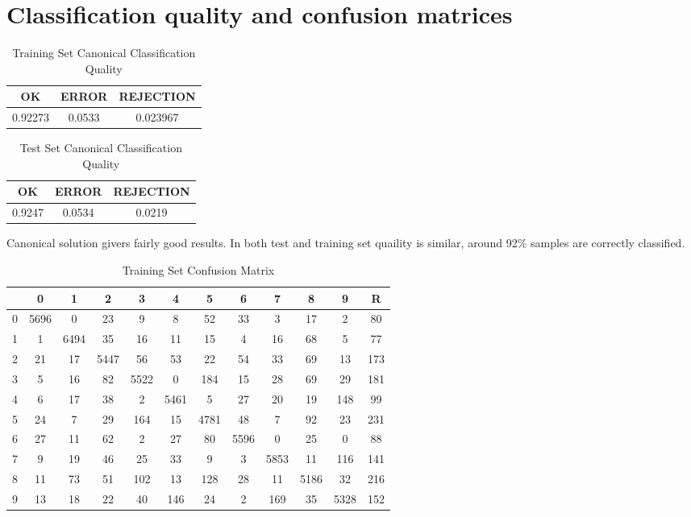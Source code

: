 \documentclass[a4paper, 11pt, wide]{article}
\begin{document}
  \section{Classification quality and confusion matrices}
  \begin{table}[H]
  \begin{center}
  \begin{tabular}{ |c|c|c| } 
  \hline
  OK & ERROR & REJECTION \\ 
  \hline
   0.92273 & 0.0533 & 0.023967 \\
  \hline
  \end{tabular}
  \end{center}
  \caption{Training Set Canonical Classification Quality}
  \end{table}
  \begin{table}[H]
  \begin{center}
  \begin{tabular}{ |c|c|c| } 
  \hline
  OK & ERROR & REJECTION \\ 
  \hline
  0.9247 & 0.0534 & 0.0219 \\
  \hline
  \end{tabular}
  \caption{Test Set Canonical Classification Quality }
  \end{center}
  \end{table}
  Canonical solution givers fairly good results.
  In both test and training set quaility is similar, around 92\% samples are correctly
  classified. \\
  \begin{table}[H]
  \begin{center}
  \begin{tabular}{ |c|c c c c c c c c c c|c| } 
  \hline
   & 0 & 1 & 2 & 3 & 4 & 5 & 6 & 7 & 8 & 9 & R\\ 
  \hline
	 0 & 5696 & 0 & 23 & 9 & 8 & 52 & 33 & 3 & 17 & 2 & 80 \\
	 1 & 1 & 6494 & 35 & 16 & 11 & 15 & 4 & 16 & 68 & 5 & 77 \\
	 2 & 21 & 17 & 5447 & 56 & 53 & 22 & 54 & 33 & 69 & 13 & 173 \\
	 3 & 5 & 16 & 82 & 5522 & 0 & 184 & 15 & 28 & 69 & 29 & 181 \\
	 4 & 6 & 17 & 38 & 2 & 5461 & 5 & 27 & 20 & 19 & 148 & 99 \\
	 5 & 24 & 7 & 29 & 164 & 15 & 4781 & 48 & 7 & 92 & 23 & 231 \\
	 6 & 27 & 11 & 62 & 2 & 27 & 80 & 5596 & 0 & 25 & 0 & 88 \\
	 7 & 9 & 19 & 46 & 25 & 33 & 9 & 3 & 5853 & 11 & 116 & 141 \\
	 8 & 11 & 73 & 51 & 102 & 13 & 128 & 28 & 11 & 5186 & 32 & 216 \\
	 9 & 13 & 18 & 22 & 40 & 146 & 24 & 2 & 169 & 35 & 5328 & 152 \\
   \hline
  \end{tabular}
  \end{center}
  \caption{Training Set Confusion Matrix}
  \end{table}
\end{document}
